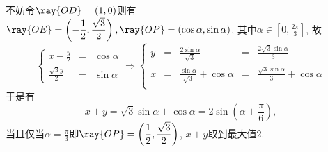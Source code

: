 \documentclass[8pt]{article}
\begin{document}
\begin{easonbigproblem}
			不妨令\(\ray{OD} = (1, 0)\)则有\(\ray{OE} = \displaystyle \left(-\frac{1}{2}, \frac{\sqrt{3}}{2}\right), \ray{OP} = (\cos \alpha, \sin \alpha)\), 其中\(\alpha \in \displaystyle \left[0, \frac{2\pi}{3}\right]\), 故
			\begin{displaymath}
				\left\{
					\begin{array}{rcl}
						x - \frac{y}{2} &=& \cos \alpha\\
						\frac{\sqrt{3}y}{2} &=& \sin \alpha
					\end{array}
				\right.
				\Rightarrow
				\left\{
					\begin{array}{rcccl}
						y &=& \frac{2\sin\alpha}{\sqrt{3}} &=& \frac{2\sqrt{3}\sin\alpha}{3}\\
						x &=& \frac{\sin\alpha}{\sqrt{3}} + \cos \alpha &=& \frac{\sqrt{3}\sin \alpha}{3} + \cos \alpha\\
					\end{array}
				\right.
			\end{displaymath}
			于是有
			\begin{displaymath}
				x+y = \sqrt{3} \sin \alpha + \cos \alpha = 2 \sin \left(\alpha + \frac{\pi}{6}\right),
			\end{displaymath}
			当且仅当\(\alpha = \displaystyle \frac{\pi}{3}\)即\(\ray{OP} = \displaystyle \left(\frac{1}{2}, \frac{\sqrt{3}}{2}\right)\), \(x+y\)取到最大值\(2\).
		\end{easonbigproblem}
\end{document}
